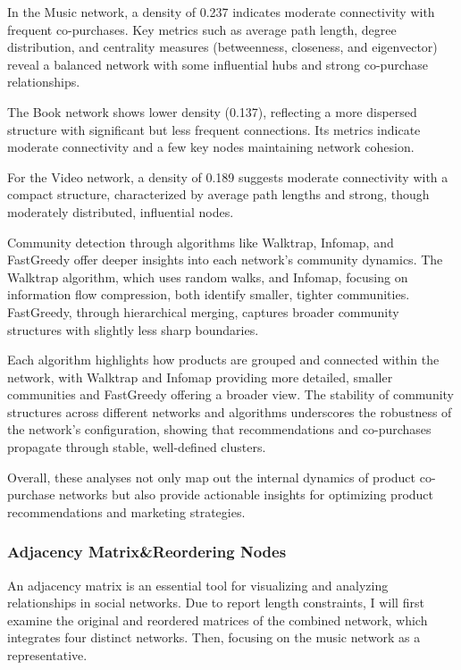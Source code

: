 \documentclass[
]{article}
\begin{document}
In the Music network, a density of 0.237 indicates moderate connectivity
with frequent co-purchases. Key metrics such as average path length,
degree distribution, and centrality measures (betweenness, closeness,
and eigenvector) reveal a balanced network with some influential hubs
and strong co-purchase relationships.

The Book network shows lower density (0.137), reflecting a more
dispersed structure with significant but less frequent connections. Its
metrics indicate moderate connectivity and a few key nodes maintaining
network cohesion.

For the Video network, a density of 0.189 suggests moderate connectivity
with a compact structure, characterized by average path lengths and
strong, though moderately distributed, influential nodes.

Community detection through algorithms like Walktrap, Infomap, and
FastGreedy offer deeper insights into each network's community dynamics.
The Walktrap algorithm, which uses random walks, and Infomap, focusing
on information flow compression, both identify smaller, tighter
communities. FastGreedy, through hierarchical merging, captures broader
community structures with slightly less sharp boundaries.

Each algorithm highlights how products are grouped and connected within
the network, with Walktrap and Infomap providing more detailed, smaller
communities and FastGreedy offering a broader view. The stability of
community structures across different networks and algorithms
underscores the robustness of the network's configuration, showing that
recommendations and co-purchases propagate through stable, well-defined
clusters.

Overall, these analyses not only map out the internal dynamics of
product co-purchase networks but also provide actionable insights for
optimizing product recommendations and marketing strategies.

\subsubsection{Adjacency Matrix\&Reordering
Nodes}\label{adjacency-matrixreordering-nodes}

An adjacency matrix is an essential tool for visualizing and analyzing
relationships in social networks. Due to report length constraints, I
will first examine the original and reordered matrices of the combined
network, which integrates four distinct networks. Then, focusing on the
music network as a representative.
\end{document}
